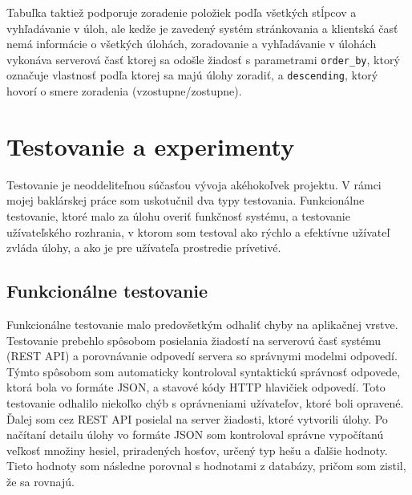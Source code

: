\documentclass[slovak]{fitthesis}
\begin{document}
Tabuľka taktiež podporuje zoradenie položiek podľa všetkých stĺpcov a vyhľadávanie v úloh, ale kedže je zavedený systém stránkovania a klientská časť nemá informácie o všetkých úlohách, zoradovanie a vyhľadávanie v úlohách vykonáva serverová časť ktorej sa odošle žiadosť s parametrami \texttt{order\_by}, ktorý označuje vlastnosť podľa ktorej sa majú úlohy zoradiť, a \texttt{descending}, ktorý hovorí o smere zoradenia (vzostupne/zostupne).



\chapter{Testovanie a experimenty}\label{testovanie}
Testovanie je neoddeliteľnou súčasťou vývoja akéhokoľvek projektu. V rámci mojej baklárskej práce som uskotučnil dva typy testovania. Funkcionálne testovanie, ktoré malo za úlohu overiť funkčnosť systému, a testovanie užívateľského rozhrania, v ktorom som testoval ako rýchlo a efektívne užívateľ zvláda úlohy, a ako je pre užívateľa  prostredie prívetivé.

\section{Funkcionálne testovanie}
Funkcionálne testovanie malo predovšetkým odhaliť chyby na aplikačnej vrstve. Testovanie prebehlo spôsobom posielania žiadostí na serverovú časť systému (REST API) a porovnávanie odpovedí servera so správnymi modelmi odpovedí. Týmto spôsobom som automaticky kontroloval syntaktickú správnosť odpovede, ktorá bola vo formáte JSON, a stavové kódy HTTP hlavičiek odpovedí. Toto testovanie odhalilo niekoľko chýb s oprávneniami užívateľov, ktoré boli opravené. Ďalej som cez REST API posielal na server žiadosti, ktoré vytvorili úlohy. Po načítaní detailu úlohy vo formáte JSON som kontroloval správne vypočítanú veľkosť množiny hesiel, priradených hosťov, určený typ hešu a ďalšie hodnoty. Tieto hodnoty som následne porovnal s hodnotami z databázy, pričom som zistil, že sa rovnajú.
\end{document}
